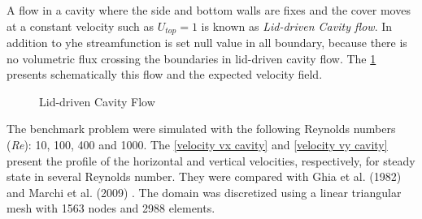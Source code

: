 A flow in a cavity where the side and bottom walls are fixes and 
the cover moves at a constant velocity such as \textit{$U_{top}=1$} 
is known as \textit {Lid-driven Cavity flow}.
In addition to 
yhe streamfunction is set null value in all boundary, 
because there is no volumetric flux crossing the boundaries 
in lid-driven cavity flow.
The \ref{cavity} presents schematically this flow and 
the expected velocity field.

\vspace{1cm}
\begin{figure}[H]
\begin{center}
\end{center}
\caption{Lid-driven Cavity Flow}
\label{cavity}
\end{figure}

\bigskip
The benchmark problem were simulated with the following 
Reynolds numbers (\textit{Re}): 10, 100, 400 and 1000.
The \ref{velocity vx cavity} and \ref{velocity vy cavity} 
present the profile of the horizontal and vertical velocities,
respectively,
for steady state in several Reynolds number. 
They were compared with 
Ghia et al. (1982) \cite{ghia1982} and 
Marchi et al. (2009) \cite{marchi2009}. 
The domain was discretized using a linear triangular mesh 
with 1563 nodes and 2988 elements.

